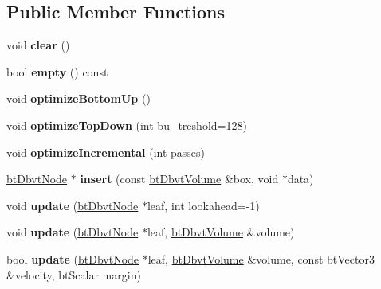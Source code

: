 \subsection*{Public Member Functions}
\begin{DoxyCompactItemize}
\item 
\mbox{\label{structbtDbvt_a91d88cec6f5e212809cb9f47a967090c}} 
void {\bfseries clear} ()
\item 
\mbox{\label{structbtDbvt_a88e6b1c04dfb42e96c68662c74790b24}} 
bool {\bfseries empty} () const
\item 
\mbox{\label{structbtDbvt_a03c5cfc17ee3f6a89d86bf1028db34b0}} 
void {\bfseries optimize\+Bottom\+Up} ()
\item 
\mbox{\label{structbtDbvt_a20c410b4825eab53cdcd2e2870e289aa}} 
void {\bfseries optimize\+Top\+Down} (int bu\+\_\+treshold=128)
\item 
\mbox{\label{structbtDbvt_a198643b190f8cdac7d7d62cef8cf9bb1}} 
void {\bfseries optimize\+Incremental} (int passes)
\item 
\mbox{\label{structbtDbvt_a0efd4485566228688870dc7340365d03}} 
\hyperlink{structbtDbvtNode}{bt\+Dbvt\+Node} $\ast$ {\bfseries insert} (const \hyperlink{structbtDbvtAabbMm}{bt\+Dbvt\+Volume} \&box, void $\ast$data)
\item 
\mbox{\label{structbtDbvt_a6efe1f6bb9abd80ea76d1bfa97cebd2b}} 
void {\bfseries update} (\hyperlink{structbtDbvtNode}{bt\+Dbvt\+Node} $\ast$leaf, int lookahead=-\/1)
\item 
\mbox{\label{structbtDbvt_a9a3ffbdaf6e85eb9ea7ac14094bcf139}} 
void {\bfseries update} (\hyperlink{structbtDbvtNode}{bt\+Dbvt\+Node} $\ast$leaf, \hyperlink{structbtDbvtAabbMm}{bt\+Dbvt\+Volume} \&volume)
\item 
\mbox{\label{structbtDbvt_a49dd2a5129f72f2fef26c52d4c326c8d}} 
bool {\bfseries update} (\hyperlink{structbtDbvtNode}{bt\+Dbvt\+Node} $\ast$leaf, \hyperlink{structbtDbvtAabbMm}{bt\+Dbvt\+Volume} \&volume, const bt\+Vector3 \&velocity, bt\+Scalar margin)
\item 

\end{DoxyCompactItemize}
